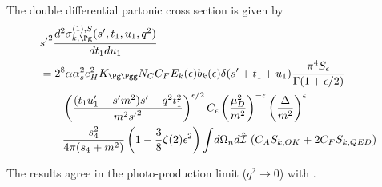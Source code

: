 The double differential partonic cross section is given by
\begin{align}
&{s'}^2\frac{d^2\sigma_{k,\Pg}^{(1),S}(s',t_1,u_1,q^2)}{dt_1du_1} \nonumber\\
 &= 2^8\alpha\alpha_s^2 e_H^2 K_{\Pg\Pgg}N_CC_F E_k(\epsilon) b_k(\epsilon)\delta(s'+t_1+u_1)\frac{\pi^4 S_\epsilon}{\Gamma(1+\epsilon/2)} \nonumber\\
 &\hspace{20pt} \left(\frac{(t_1u_1'-s'm^2)s' - q^2t_1^2}{m^2{s'}^2}\right)^{\epsilon/2} C_\epsilon \left(\frac{\mu_D^2}{m^2}\right)^{-\epsilon} \left(\frac \Delta {m^2}\right)^\epsilon \nonumber\\
 &\hspace{20pt}\frac{s_4^2}{4\pi(s_4+m^2)}\left(1-\frac 3 8 \zeta(2)\epsilon^2\right)\int\!d\Omega_n d\hat{\mathcal I}\,\left(C_A S_{k,OK} + 2C_F S_{k,QED}\right)
\end{align}

The results agree in the photo-production limit ($q^2\rightarrow 0$) with \cite{Bojak:1998zm}.
